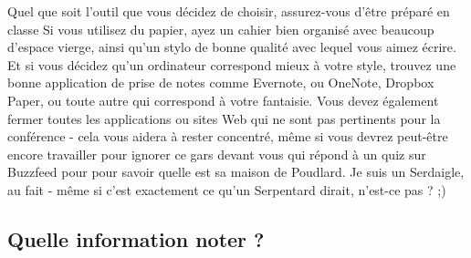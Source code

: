 Quel que soit l'outil que vous décidez de choisir, assurez-vous d'être
préparé en classe Si vous utilisez du papier, ayez un cahier bien
organisé avec beaucoup d'espace vierge, ainsi qu'un stylo de bonne
qualité avec lequel vous aimez écrire. Et si vous décidez qu'un
ordinateur correspond mieux à votre style, trouvez une bonne application
de prise de notes comme Evernote, ou OneNote, Dropbox Paper, ou toute
autre qui correspond à votre fantaisie. Vous devez également fermer
toutes les applications ou sites Web qui ne sont pas pertinents pour la
conférence - cela vous aidera à rester concentré, même si vous devrez
peut-être encore travailler pour ignorer ce gars devant vous qui répond
à un quiz sur Buzzfeed pour pour savoir quelle est sa maison de
Poudlard. Je suis un Serdaigle, au fait - même si c'est exactement ce
qu'un Serpentard dirait, n'est-ce pas ? ;)

\hypertarget{quelle-information-noter}{%
\subsection{Quelle information noter ?}\label{quelle-information-noter}}

